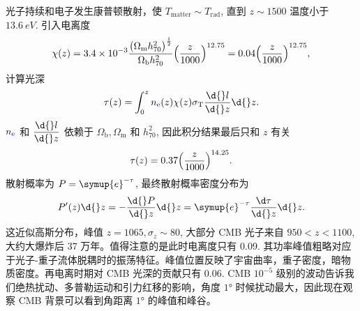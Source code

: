 \documentclass[../天体物理基础.tex]{subfiles}
\begin{document}
光子持续和电子发生康普顿散射，使 $T_{\mathrm{matter}}\sim{}T_{\mathrm{rad}}$, 直到 $z\sim1500$ 温度小于 $\qty{13.6}{eV}$. 引入电离度
\begin{equation}
\chi\mleft(z\mright)=\qty{3.4e-3}{}\frac{\mleft(\Omega_{\mathrm{m}}h_{70}^{2}\mright)^{\frac{1}{2}}}{\Omega_{\mathrm{b}}h_{70}^{2}}\mleft(\frac{z}{1000}\mright)^{12.75}=0.04\mleft(\frac{z}{1000}\mright)^{12.75},
\end{equation}
计算光深
\begin{equation}
\tau\mleft(z\mright)=\int_{0}^{z}n_{{\color{blue}{\ce{e}}}}\mleft(z\mright)\chi\mleft(z\mright)\sigma_{\mathrm{T}}\frac{\d{}l}{\d{}z}\d{}z.
\end{equation}
$n_{{\color{blue}{\ce{e}}}}$ 和 $\dfrac{\d{}l}{\d{}z}$ 依赖于 $\Omega_{\mathrm{b}},\Omega_{\mathrm{m}}$ 和 $h_{70}^{2}$, 因此积分结果最后只和 $z$ 有关
\begin{equation}
\tau\mleft(z\mright)=0.37\mleft(\frac{z}{1000}\mright)^{14.25}.
\end{equation}
散射概率为 $P=\symup{e}^{-\tau}$, 最终散射概率密度分布为
\begin{equation}
P'\mleft(z\mright)\d{}z=-\frac{\d{}P}{\d{}z}\d{}z=\symup{e}^{-\tau}\frac{\d\tau}{\d{}z}\d{}z.
\end{equation}
这近似高斯分布，峰值 $z=1065,\sigma_{z}\sim80$, 大部分 CMB 光子来自 $950<z<1100$, 大约大爆炸后 37 万年。值得注意的是此时电离度只有 0.09. 其功率峰值粗略对应于光子{}-{}重子流体脱耦时的振荡特征。峰值位置反映了宇宙曲率，重子密度，暗物质密度。再电离时期对 CMB 光深的贡献只有 0.06. CMB $10^{-5}$ 级别的波动告诉我们绝热扰动、多普勒运动和引力红移的影响，角度 $\ang{1;;}$ 时候扰动最大，因此现在观察 CMB 背景可以看到角距离 $\ang{1;;}$ 的峰值和峰谷。
\end{document}
